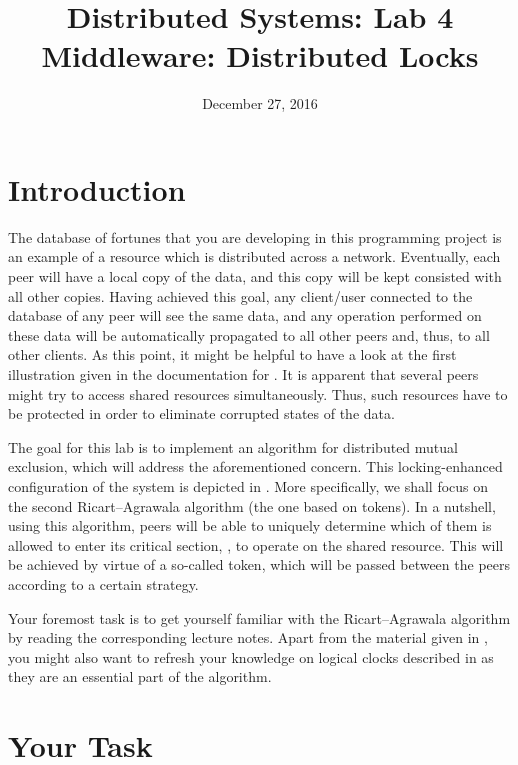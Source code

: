 \documentclass[a4paper]{article}
\title{%
  Distributed Systems: Lab 4\\%
  Middleware: Distributed Locks%
}
\author{}
\date{December 27, 2016}
\begin{document}
\maketitle

\section{Introduction}

The database of fortunes that you are developing in this programming project is
an example of a resource which is distributed across a network. Eventually, each
peer will have a local copy of the data, and this copy will be kept consisted
with all other copies. Having achieved this goal, any client/user connected to
the database of any peer will see the same data, and any operation performed on
these data will be automatically propagated to all other peers and, thus, to all
other clients. As this point, it might be helpful to have a look at the first
illustration given in the documentation for . It is apparent that
several peers might try to access shared resources simultaneously. Thus, such
resources have to be protected in order to eliminate corrupted states of the
data.

The goal for this lab is to implement an algorithm for distributed mutual
exclusion, which will address the aforementioned concern. This locking-enhanced
configuration of the system is depicted in . More specifically, we
shall focus on the second Ricart--Agrawala algorithm \cite{lecture67} (the one
based on tokens). In a nutshell, using this algorithm, peers will be able to
uniquely determine which of them is allowed to enter its critical section, \ie,
to operate on the shared resource. This will be achieved by virtue of a
so-called token, which will be passed between the peers according to a certain
strategy.

Your foremost task is to get yourself familiar with the Ricart--Agrawala
algorithm by reading the corresponding lecture notes. Apart from the material
given in \cite{lecture67}, you might also want to refresh your knowledge on
logical clocks described in \cite{lecture5} as they are an essential part of the
algorithm.

\section{Your Task}
\end{document}
